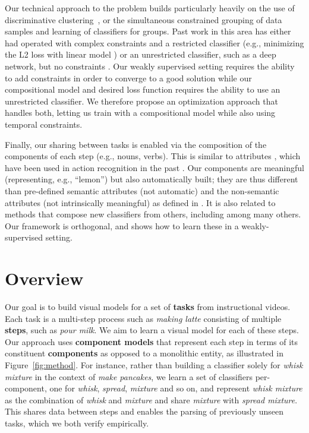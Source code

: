 \documentclass[10pt,twocolumn,letterpaper]{article}
\begin{document}
Our technical approach to the problem builds particularly heavily on the use of
discriminative clustering~\cite{Bach07diffrac,Xu2004maximum}, or the simultaneous constrained
grouping of data samples and learning of classifiers for groups.
Past work in this area has either had operated with complex constraints and a restricted classifier (e.g., minimizing the L2 loss with linear model
\cite{Bach07diffrac,alayrac16objectstates}) or an unrestricted classifier, such as a deep network, but no constraints
\cite{bojanowski17unsupervised,Caron2018}. Our weakly supervised setting requires the ability to add constraints
in order to converge to a good solution while our compositional model and desired loss function requires the ability to use an unrestricted classifier.
We therefore propose an optimization approach that handles both, letting us train with a compositional model while also using
temporal constraints.

Finally, our sharing between tasks is enabled via the composition of the components of each step (e.g., nouns, verbs).
This is similar to attributes \cite{Farhadi09,Ferrari07}, which have been used in action recognition in the past \cite{Liu11,Yao11}.
Our components are meaningful (representing, e.g., ``lemon'') but also
automatically built; they are thus different than pre-defined semantic attributes (not automatic)
and the non-semantic attributes (not intrinsically meaningful) as defined in \cite{Farhadi09}.
It is also related to methods that compose new classifiers from others, including
\cite{misra2017composing,Yatskar_Commonly_17,guadarrama13} among many others. Our framework is orthogonal, and shows how to learn these in a weakly-supervised setting.

\section{Overview}
\label{sec:overview}
Our goal is to build visual models for a set of {\bf tasks} from
instructional videos.  Each task is a multi-step process such as
{\it making latte} consisting of multiple {\bf steps}, such as {\it pour milk}.
We aim to learn a visual model for each of these steps. Our approach
uses {\bf component models} that represent each step in terms of
its constituent {\bf components} as opposed to a monolithic entity, as
illustrated in Figure~\ref{fig:method}. For instance, rather than building a classifier
solely for {\it whisk mixture} in the context of {\it make pancakes}, we learn
a set of classifiers per-component, one for {\it whisk}, {\it spread}, {\it mixture} and so on, and
represent {\it whisk mixture} as the combination of {\it whisk} and {\it mixture}
and share {\it mixture} with {\it spread mixture}.
This shares data between steps and enables the parsing of previously unseen
tasks, which we both verify empirically.
\end{document}
